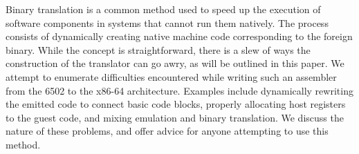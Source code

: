 Binary translation is a common method used to speed up the execution of
software components in systems that cannot run them natively.  The process
consists of dynamically creating native machine code corresponding to the
foreign binary.  While the concept is straightforward, there is a slew of ways
the construction of the translator can go awry, as will be outlined in this
paper.  We attempt to enumerate difficulties encountered while writing such an
assembler from the 6502 to the x86-64 architecture.  Examples include
dynamically rewriting the emitted code to connect basic code blocks, properly
allocating host registers to the guest code, and mixing emulation and binary
translation.  We discuss the nature of these problems, and offer advice for
anyone attempting to use this method.


